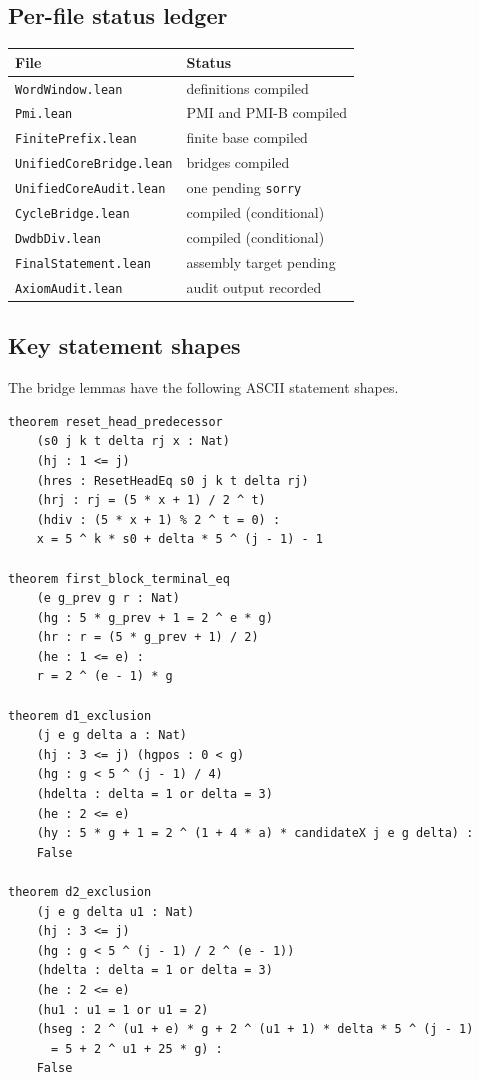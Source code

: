 \subsection{Per-file status ledger}

\begin{center}
\small
\begin{tabular}{@{}p{}p{}@{}}
\toprule
File & Status \\
\midrule
\texttt{WordWindow.lean} & definitions compiled \\
\texttt{Pmi.lean} & PMI and PMI-B compiled \\
\texttt{FinitePrefix.lean} & finite base compiled \\
\texttt{UnifiedCoreBridge.lean} & bridges compiled \\
\texttt{UnifiedCoreAudit.lean} & one pending \texttt{sorry} \\
\texttt{CycleBridge.lean} & compiled (conditional) \\
\texttt{DwdbDiv.lean} & compiled (conditional) \\
\texttt{FinalStatement.lean} & assembly target pending \\
\texttt{AxiomAudit.lean} & audit output recorded \\
\bottomrule
\end{tabular}
\end{center}

\subsection{Key statement shapes}

The bridge lemmas have the following ASCII statement shapes.
\begin{verbatim}
theorem reset_head_predecessor
    (s0 j k t delta rj x : Nat)
    (hj : 1 <= j)
    (hres : ResetHeadEq s0 j k t delta rj)
    (hrj : rj = (5 * x + 1) / 2 ^ t)
    (hdiv : (5 * x + 1) % 2 ^ t = 0) :
    x = 5 ^ k * s0 + delta * 5 ^ (j - 1) - 1

theorem first_block_terminal_eq
    (e g_prev g r : Nat)
    (hg : 5 * g_prev + 1 = 2 ^ e * g)
    (hr : r = (5 * g_prev + 1) / 2)
    (he : 1 <= e) :
    r = 2 ^ (e - 1) * g

theorem d1_exclusion
    (j e g delta a : Nat)
    (hj : 3 <= j) (hgpos : 0 < g)
    (hg : g < 5 ^ (j - 1) / 4)
    (hdelta : delta = 1 or delta = 3)
    (he : 2 <= e)
    (hy : 5 * g + 1 = 2 ^ (1 + 4 * a) * candidateX j e g delta) :
    False

theorem d2_exclusion
    (j e g delta u1 : Nat)
    (hj : 3 <= j)
    (hg : g < 5 ^ (j - 1) / 2 ^ (e - 1))
    (hdelta : delta = 1 or delta = 3)
    (he : 2 <= e)
    (hu1 : u1 = 1 or u1 = 2)
    (hseg : 2 ^ (u1 + e) * g + 2 ^ (u1 + 1) * delta * 5 ^ (j - 1)
      = 5 + 2 ^ u1 + 25 * g) :
    False
\end{verbatim}

